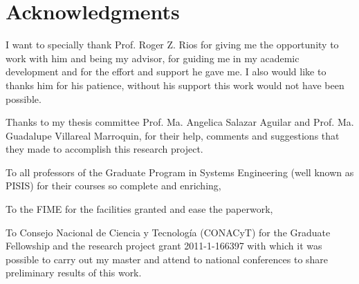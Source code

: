 
\chapter{Acknowledgments}

I want to specially thank
Prof. Roger Z. Rios
for giving me the opportunity to work with him
and being my advisor,
for guiding me in my academic development
and for the effort and support he gave me.
I also would like to thanks him
for his patience,
without his support
this work would not have been possible. 

Thanks to my thesis committee
Prof. Ma. Angelica Salazar Aguilar
and Prof. Ma. Guadalupe Villareal Marroquin,
for their help,
comments and suggestions
that they made
to accomplish this research project.

To all professors
of the Graduate Program in Systems Engineering
(well known as PISIS)
for their courses so complete and enriching,

To the FIME
for the facilities granted
and ease the paperwork,

To Consejo Nacional de Ciencia y Tecnología (CONACyT)
for the Graduate Fellowship
and the research project grant 2011-1-166397
with which it was possible to carry out my master
and attend to national conferences
to share preliminary results of this work.
